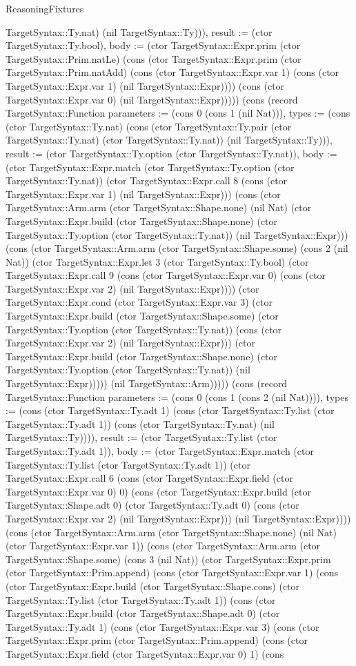 \begin{lexlean}{ReasoningFixtures}
\begin{semanticmodule}
{TargetSyntax::Ty.nat) (nil TargetSyntax::Ty))), result := (ctor TargetSyntax::Ty.bool), body := (ctor TargetSyntax::Expr.prim (ctor TargetSyntax::Prim.natLe) (cons (ctor TargetSyntax::Expr.prim (ctor TargetSyntax::Prim.natAdd) (cons (ctor TargetSyntax::Expr.var 1) (cons (ctor TargetSyntax::Expr.var 1) (nil TargetSyntax::Expr)))) (cons (ctor TargetSyntax::Expr.var 0) (nil TargetSyntax::Expr))))}) (cons (record TargetSyntax::Function {parameters := (cons 0 (cons 1 (nil Nat))), types := (cons (ctor TargetSyntax::Ty.nat) (cons (ctor TargetSyntax::Ty.pair (ctor TargetSyntax::Ty.nat) (ctor TargetSyntax::Ty.nat)) (nil TargetSyntax::Ty))), result := (ctor TargetSyntax::Ty.option (ctor TargetSyntax::Ty.nat)), body := (ctor TargetSyntax::Expr.match (ctor TargetSyntax::Ty.option (ctor TargetSyntax::Ty.nat)) (ctor TargetSyntax::Expr.call 8 (cons (ctor TargetSyntax::Expr.var 1) (nil TargetSyntax::Expr))) (cons (ctor TargetSyntax::Arm.arm (ctor TargetSyntax::Shape.none) (nil Nat) (ctor TargetSyntax::Expr.build (ctor TargetSyntax::Shape.none) (ctor TargetSyntax::Ty.option (ctor TargetSyntax::Ty.nat)) (nil TargetSyntax::Expr))) (cons (ctor TargetSyntax::Arm.arm (ctor TargetSyntax::Shape.some) (cons 2 (nil Nat)) (ctor TargetSyntax::Expr.let 3 (ctor TargetSyntax::Ty.bool) (ctor TargetSyntax::Expr.call 9 (cons (ctor TargetSyntax::Expr.var 0) (cons (ctor TargetSyntax::Expr.var 2) (nil TargetSyntax::Expr)))) (ctor TargetSyntax::Expr.cond (ctor TargetSyntax::Expr.var 3) (ctor TargetSyntax::Expr.build (ctor TargetSyntax::Shape.some) (ctor TargetSyntax::Ty.option (ctor TargetSyntax::Ty.nat)) (cons (ctor TargetSyntax::Expr.var 2) (nil TargetSyntax::Expr))) (ctor TargetSyntax::Expr.build (ctor TargetSyntax::Shape.none) (ctor TargetSyntax::Ty.option (ctor TargetSyntax::Ty.nat)) (nil TargetSyntax::Expr))))) (nil TargetSyntax::Arm))))}) (cons (record TargetSyntax::Function {parameters := (cons 0 (cons 1 (cons 2 (nil Nat)))), types := (cons (ctor TargetSyntax::Ty.adt 1) (cons (ctor TargetSyntax::Ty.list (ctor TargetSyntax::Ty.adt 1)) (cons (ctor TargetSyntax::Ty.nat) (nil TargetSyntax::Ty)))), result := (ctor TargetSyntax::Ty.list (ctor TargetSyntax::Ty.adt 1)), body := (ctor TargetSyntax::Expr.match (ctor TargetSyntax::Ty.list (ctor TargetSyntax::Ty.adt 1)) (ctor TargetSyntax::Expr.call 6 (cons (ctor TargetSyntax::Expr.field (ctor TargetSyntax::Expr.var 0) 0) (cons (ctor TargetSyntax::Expr.build (ctor TargetSyntax::Shape.adt 0) (ctor TargetSyntax::Ty.adt 0) (cons (ctor TargetSyntax::Expr.var 2) (nil TargetSyntax::Expr))) (nil TargetSyntax::Expr)))) (cons (ctor TargetSyntax::Arm.arm (ctor TargetSyntax::Shape.none) (nil Nat) (ctor TargetSyntax::Expr.var 1)) (cons (ctor TargetSyntax::Arm.arm (ctor TargetSyntax::Shape.some) (cons 3 (nil Nat)) (ctor TargetSyntax::Expr.prim (ctor TargetSyntax::Prim.append) (cons (ctor TargetSyntax::Expr.var 1) (cons (ctor TargetSyntax::Expr.build (ctor TargetSyntax::Shape.cons) (ctor TargetSyntax::Ty.list (ctor TargetSyntax::Ty.adt 1)) (cons (ctor TargetSyntax::Expr.build (ctor TargetSyntax::Shape.adt 0) (ctor TargetSyntax::Ty.adt 1) (cons (ctor TargetSyntax::Expr.var 3) (cons (ctor TargetSyntax::Expr.prim (ctor TargetSyntax::Prim.append) (cons (ctor TargetSyntax::Expr.field (ctor TargetSyntax::Expr.var 0) 1) (cons }
\end{semanticmodule}
\end{lexlean}
